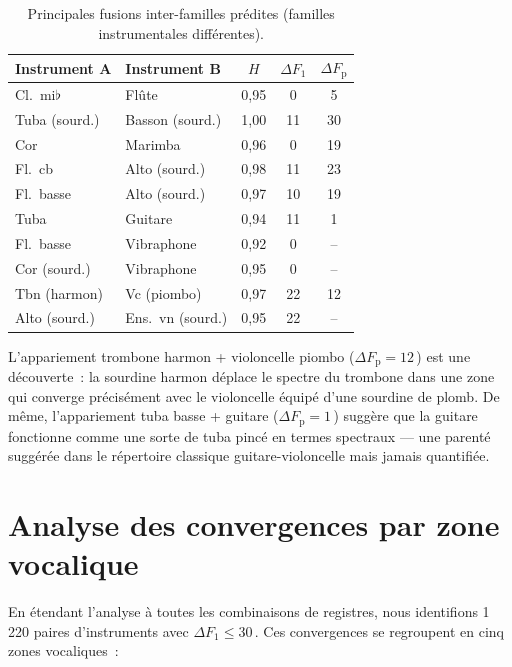 \documentclass[journal]{IEEEtran}
\newcommand{\Fp}{F_\mathrm{p}}
\newcommand{\Hz}{\,\text{Hz}}
\begin{document}
\begin{table}[!t]
\centering
\caption{Principales fusions inter-familles prédites (familles instrumentales différentes).}
\label{tab:fusions}
\small
\begin{tabular}{@{}llccc@{}}
\toprule
\textbf{Instrument A} & \textbf{Instrument B} & $H$ & $\Delta F_1$ & $\Delta\Fp$ \\
\midrule
Cl.~mi$\flat$   & Flûte            & 0{,}95 &  0  &  5 \\
Tuba (sourd.)   & Basson (sourd.)  & 1{,}00 & 11  & 30 \\
Cor             & Marimba          & 0{,}96 &  0  & 19 \\
Fl.~cb          & Alto (sourd.)    & 0{,}98 & 11  & 23 \\
Fl.~basse       & Alto (sourd.)    & 0{,}97 & 10  & 19 \\
Tuba            & Guitare          & 0{,}94 & 11  &  1 \\
Fl.~basse       & Vibraphone       & 0{,}92 &  0  &  -- \\
Cor (sourd.)    & Vibraphone       & 0{,}95 &  0  &  -- \\
Tbn (harmon)    & Vc (piombo)      & 0{,}97 & 22  & 12 \\
Alto (sourd.)   & Ens.~vn (sourd.) & 0{,}95 & 22  &  -- \\
\bottomrule
\end{tabular}
\end{table}

L'appariement trombone harmon + violoncelle piombo ($\Delta\Fp = 12$\Hz) est une découverte~: la sourdine harmon déplace le spectre du trombone dans une zone qui converge précisément avec le violoncelle équipé d'une sourdine de plomb. De même, l'appariement tuba basse + guitare ($\Delta\Fp = 1$\Hz) suggère que la guitare fonctionne comme une sorte de \og tuba pincé \fg{} en termes spectraux --- une parenté suggérée dans le répertoire classique guitare-violoncelle mais jamais quantifiée.

\section{Analyse des convergences par zone vocalique}
\label{sec:vowels}

En étendant l'analyse à toutes les combinaisons de registres, nous identifions 1\,220 paires d'instruments avec $\Delta F_1 \leq 30$\Hz. Ces convergences se regroupent en cinq zones vocaliques~:
\end{document}
